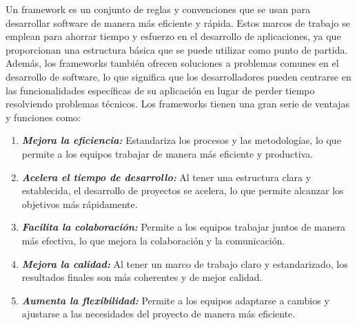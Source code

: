 \documentclass[12pt,onehalfspacing]{report}
\begin{document}
Un framework es un conjunto de reglas y convenciones que se usan para desarrollar software de manera más eficiente y rápida. Estos marcos de trabajo se emplean para ahorrar tiempo y esfuerzo en el desarrollo de aplicaciones, ya que proporcionan una estructura básica que se puede utilizar como punto de partida. Además, los frameworks también ofrecen soluciones a problemas comunes en el desarrollo de software, lo que significa que los desarrolladores pueden centrarse en las funcionalidades específicas de su aplicación en lugar de perder tiempo resolviendo problemas técnicos. Los frameworks tienen una gran serie de ventajas y funciones como:
\begin{enumerate}
    \item \textbf{\textit{Mejora la eficiencia:}} Estandariza los procesos y las metodologías, lo que permite a los equipos trabajar de manera más eficiente y productiva.
    \item \textbf{\textit{Acelera el tiempo de desarrollo:}} Al tener una estructura clara y establecida, el desarrollo de proyectos se acelera, lo que permite alcanzar los objetivos más rápidamente.
    \item \textbf{\textit{Facilita la colaboración:}} Permite a los equipos trabajar juntos de manera más efectiva, lo que mejora la colaboración y la comunicación.
    \item \textbf{\textit{Mejora la calidad:}} Al tener un marco de trabajo claro y estandarizado, los resultados finales son más coherentes y de mejor calidad.
    \item \textbf{\textit{Aumenta la flexibilidad:}} Permite a los equipos adaptarse a cambios y ajustarse a las necesidades del proyecto de manera más eficiente.
\end{enumerate}
\end{document}
